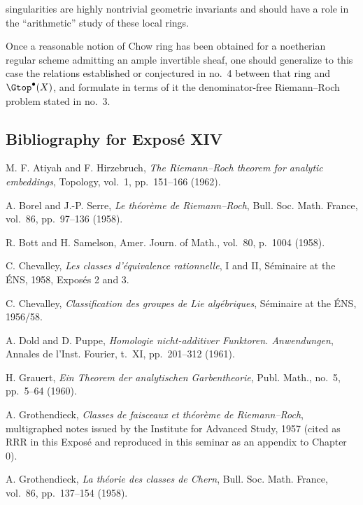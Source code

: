 singularities are highly nontrivial geometric invariants and should have a
role in the ``arithmetic'' study of these local rings.

Once a reasonable notion of Chow ring has been obtained for a noetherian
regular scheme admitting an ample invertible sheaf, one should generalize
to this case the relations established or conjectured in no.~4 between
that ring and $\Gtop^\bullet(X)$, and formulate in terms of it the
denominator-free Riemann--Roch problem stated in no.~3.

\subsection*{Bibliography for Exposé XIV}
\begin{enumerate}[label={\textup{[\arabic*]}}]
\item M. F. Atiyah and F. Hirzebruch, \emph{The Riemann--Roch theorem for
analytic embeddings}, Topology, vol.~1, pp.~151--166 (1962).
\item A. Borel and J.-P. Serre, \emph{Le théorème de Riemann--Roch}, Bull.
Soc. Math. France, vol.~86, pp.~97--136 (1958).
\item R. Bott and H. Samelson, Amer. Journ. of Math., vol.~80, p.~1004
(1958).
\item C. Chevalley, \emph{Les classes d'équivalence rationnelle}, I and II,
Séminaire at the ÉNS, 1958, Exposés 2 and 3.
\item C. Chevalley, \emph{Classification des groupes de Lie algébriques},
Séminaire at the ÉNS, 1956/58.
\item A. Dold and D. Puppe, \emph{Homologie nicht-additiver Funktoren.
Anwendungen}, Annales de l'Inst. Fourier, t.~XI, pp.~201--312 (1961).
\item H. Grauert, \emph{Ein Theorem der analytischen Garbentheorie}, Publ.
Math., no.~5, pp.~5--64 (1960).
\item A. Grothendieck, \emph{Classes de faisceaux et théorème de
Riemann--Roch}, multigraphed notes issued by the Institute for Advanced
Study, 1957 (cited as RRR in this Exposé and reproduced in this seminar as
an appendix to Chapter 0).
\item A. Grothendieck, \emph{La théorie des classes de Chern}, Bull. Soc.
Math. France, vol.~86, pp.~137--154 (1958).


\end{enumerate}
